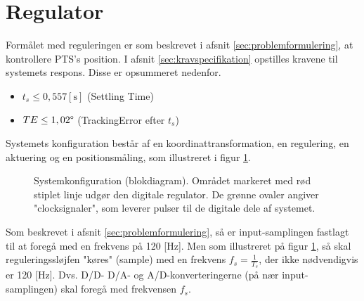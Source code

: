 \section{Regulator}
\label{sec:kontrollerdeign}
% 

Formålet med reguleringen er som beskrevet i afsnit \ref{sec:problemformulering},
at kontrollere PTS's position.
I afsnit \ref{sec:kravspecifikation} opstilles kravene til systemets respons.
Disse er opsummeret nedenfor.
\begin{itemize}
\itemsep1pt
\item \(t_{s} \leq 0,557 \mathrm{\left[s\right]}\) (Settling Time)
\item \(TE \leq 1,02\degree\) (TrackingError efter \(t_s\))
\end{itemize}

Systemets konfiguration består af en koordinattransformation,
en regulering, en aktuering og en positionsmåling, som illustreret
i figur \ref{fig:digitalkontroller1}.
\begin{figure}[!th]
\centering
\begin{tikzpicture}[scale=0.8, every node/.style={scale=0.8}, node distance=2.6cm, =>latex']

\end{tikzpicture}
\caption[Systemkonfiguration]{Systemkonfiguration (blokdiagram).
	Området markeret med rød stiplet linje udgør den digitale regulator.
	De grønne ovaler angiver "clocksignaler", som leverer pulser til de digitale dele af systemet.}
\label{fig:digitalkontroller1}
\end{figure}

Som beskrevet i afsnit \ref{sec:problemformulering},
så er input-samplingen fastlagt til at foregå med en frekvens på 120 [Hz].
Men som illustreret på figur \ref{fig:digitalkontroller1}, så skal reguleringssløjfen
"køres" (sample) med en frekvens \(f_s=\frac{1}{T_s}\), der ikke nødvendigvis er 120 [Hz].
Dvs. D/D- D/A- og A/D-konverteringerne (på nær input-samplingen) skal foregå med frekvensen \(f_s\).

